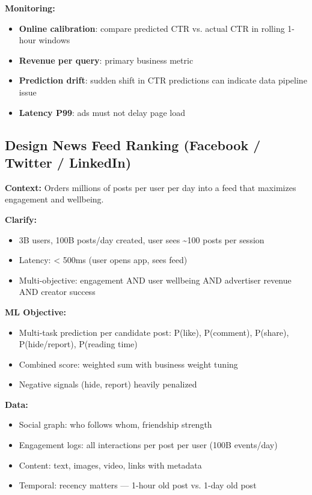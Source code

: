 \documentclass[11pt]{article}
\providecommand{\tightlist}{\setlength{\itemsep}{1pt}\setlength{\parskip}{0pt}}
\begin{document}
\textbf{Monitoring:}

\begin{itemize}
\tightlist
\item
  \textbf{Online calibration}: compare predicted CTR vs. actual CTR in rolling 1-hour windows
\item
  \textbf{Revenue per query}: primary business metric
\item
  \textbf{Prediction drift}: sudden shift in CTR predictions can indicate data pipeline issue
\item
  \textbf{Latency P99}: ads must not delay page load
\end{itemize}

\subsection{Design News Feed Ranking (Facebook / Twitter / LinkedIn)}\label{design-news-feed-ranking-facebook--twitter--linkedin}

\textbf{Context:} Orders millions of posts per user per day into a feed that maximizes engagement and wellbeing.

\textbf{Clarify:}

\begin{itemize}
\tightlist
\item
  3B users, 100B posts/day created, user sees \textasciitilde100 posts per session
\item
  Latency: \textless{} 500ms (user opens app, sees feed)
\item
  Multi-objective: engagement AND user wellbeing AND advertiser revenue AND creator success
\end{itemize}

\textbf{ML Objective:}

\begin{itemize}
\tightlist
\item
  Multi-task prediction per candidate post: P(like), P(comment), P(share), P(hide/report), P(reading time)
\item
  Combined score: weighted sum with business weight tuning
\item
  Negative signals (hide, report) heavily penalized
\end{itemize}

\textbf{Data:}

\begin{itemize}
\tightlist
\item
  Social graph: who follows whom, friendship strength
\item
  Engagement logs: all interactions per post per user (100B events/day)
\item
  Content: text, images, video, links with metadata
\item
  Temporal: recency matters --- 1-hour old post vs. 1-day old post
\end{itemize}
\end{document}
